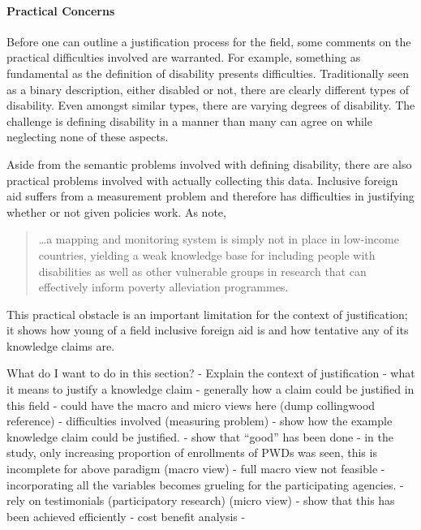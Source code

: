 \documentclass[a4paper]{article}
\begin{document}
\paragraph{Practical Concerns}

Before one can outline a justification process for the field, some comments on
the practical difficulties involved are warranted.  For example, something as
fundamental as the definition of disability presents difficulties.
Traditionally seen as a binary description, either disabled or not, there are
clearly different types of disability. Even amongst similar types, there are
varying degrees of disability. The challenge is defining disability in a
manner than many can agree on while neglecting none of these aspects.

Aside from the semantic problems involved with defining disability, there are
also practical problems involved with actually collecting this data.
Inclusive foreign aid suffers from a measurement problem and therefore has
difficulties in justifying whether or not given policies work. As
\cite{ingstad2011disability} note, 
%
\begin{quote} 
    \ldots a mapping and monitoring system is simply not in place in
    low-income countries, yielding a weak knowledge base for including people
    with disabilities as well as other vulnerable groups in research that can
    effectively inform poverty alleviation programmes.  
\end{quote}
%
This practical obstacle is an important limitation for the context of
justification; it shows how young of a field inclusive foreign aid is and how
tentative any of its knowledge claims are.


What do I want to do in this section?
- Explain the context of justification 
    - what it means to justify a knowledge claim
    - generally how a claim could be justified in this field
        - could have the macro and micro views here (dump collingwood
          reference)
        - difficulties involved (measuring problem)
- show how the example knowledge claim could be justified.
    - show that ``good'' has been done
        - in the study, only increasing proportion of enrollments of PWDs was
          seen, this is incomplete for above paradigm (macro view)
            - full macro view not feasible
                - incorporating all the variables becomes grueling for the
                participating agencies.
        - rely on testimonials (participatory research) (micro view)
    - show that this has been achieved efficiently
        - cost benefit analysis
-   
    
\end{document}

